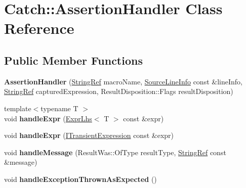 \hypertarget{classCatch_1_1AssertionHandler}{}\section{Catch\+:\+:Assertion\+Handler Class Reference}
\label{classCatch_1_1AssertionHandler}
\subsection*{Public Member Functions}
\begin{DoxyCompactItemize}
\item 
{\bfseries Assertion\+Handler} (\hyperlink{classCatch_1_1StringRef}{String\+Ref} macro\+Name, \hyperlink{structCatch_1_1SourceLineInfo}{Source\+Line\+Info} const \&line\+Info, \hyperlink{classCatch_1_1StringRef}{String\+Ref} captured\+Expression, Result\+Disposition\+::\+Flags result\+Disposition)\hypertarget{classCatch_1_1AssertionHandler_a74627e1e399b026e9acbaf95ea673643}{}\label{classCatch_1_1AssertionHandler_a74627e1e399b026e9acbaf95ea673643}

\item 
{\footnotesize template$<$typename T $>$ }\\void {\bfseries handle\+Expr} (\hyperlink{classCatch_1_1ExprLhs}{Expr\+Lhs}$<$ T $>$ const \&expr)\hypertarget{classCatch_1_1AssertionHandler_a2ef387e567bad90ec6e4b5bf5c367388}{}\label{classCatch_1_1AssertionHandler_a2ef387e567bad90ec6e4b5bf5c367388}

\item 
void {\bfseries handle\+Expr} (\hyperlink{structCatch_1_1ITransientExpression}{I\+Transient\+Expression} const \&expr)\hypertarget{classCatch_1_1AssertionHandler_afe14d9cf1b1c7f70dae439fbdb51d0c4}{}\label{classCatch_1_1AssertionHandler_afe14d9cf1b1c7f70dae439fbdb51d0c4}

\item 
void {\bfseries handle\+Message} (Result\+Was\+::\+Of\+Type result\+Type, \hyperlink{classCatch_1_1StringRef}{String\+Ref} const \&message)\hypertarget{classCatch_1_1AssertionHandler_abdb4c180ed83ec2858b2fb87712c516d}{}\label{classCatch_1_1AssertionHandler_abdb4c180ed83ec2858b2fb87712c516d}

\item 
void {\bfseries handle\+Exception\+Thrown\+As\+Expected} ()\hypertarget{classCatch_1_1AssertionHandler_ab6caf765764a4064e90fce829eec201d}{}\label{classCatch_1_1AssertionHandler_ab6caf765764a4064e90fce829eec201d}


\end{DoxyCompactItemize}
